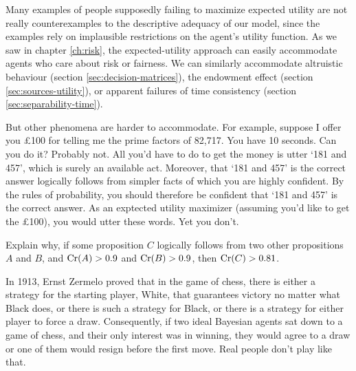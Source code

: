 Many examples of people supposedly failing to maximize expected
utility are not really counterexamples to the descriptive adequacy of
our model, since the examples rely on implausible restrictions on the
agent's utility function. As we saw in chapter \ref{ch:risk}, the
expected-utility approach can easily accommodate agents who care about
risk or fairness. We can similarly accommodate altruistic behaviour
(section \ref{sec:decision-matrices}), the endowment effect (section
\ref{sec:sources-utility}), or apparent failures of time consistency
(section \ref{sec:separability-time}).


But other phenomena are harder to accommodate. For example, suppose I
offer you £100 for telling me the prime factors of 82,717. You have 10
seconds. Can you do it? Probably not. All you'd have to do to get the
money is utter `181 and 457', which is surely an available act.
Moreover, that `181 and 457' is the correct answer logically follows
from simpler facts of which you are highly confident. By the rules of
probability, you should therefore be confident that `181 and 457' is
the correct answer. As an exptected utility maximizer (assuming you'd like
to get the £100), you would utter these words. Yet you don't.

\begin{exercise2}
  Explain why, if some proposition $C$ logically follows from two
  other propositions $A$ and $B$, and $\text{Cr}(A) > 0.9$ and $\text{Cr}(B) >
  0.9$, then $\text{Cr}(C) > 0.81$.
\end{exercise2}

In 1913, Ernst Zermelo proved that in the game of chess, there is
either a strategy for the starting player, White, that guarantees
victory no matter what Black does, or there is such a strategy for
Black, or there is a strategy for either player to force a
draw. Consequently, if two ideal Bayesian agents sat down to a game of
chess, and their only interest was in winning, they would agree to a
draw or one of them would resign before the first move. Real people
don't play like that.

